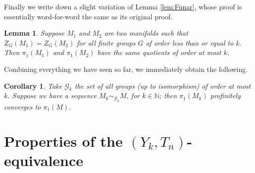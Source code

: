 \documentclass[12pt]{amsart}
\newtheorem{lem}[thm]{Lemma}
\newtheorem{cor}[thm]{Corollary}
\theoremstyle{definition}
\newcommand{\N}{\mathbb{N}}
\begin{document}
Finally we write down a slight variation of Lemma \ref{lem:Funar}, whose proof is essentially word-for-word the same as its original proof.

\begin{lem}
	Suppose $M_1$ and $M_2$ are two manifolds such that $Z_G(M_1)=Z_G(M_2)$ for all finite groups $G$ of order less than or equal to $k$. Then $\pi_1(M_1)$ and $\pi_1(M_2)$ have the same quotients of order at most $k$.
\end{lem}

Combining everything we have seen so far, we immediately obtain the following.

\begin{cor}\label{cor:convergence}
	Take $\mathcal{G}_k$ the set of all groups (up to isomorphism) of order at most $k$. Suppose  we have a sequence $M_k\sim_{\mathcal{G}_k} M$, for $k\in \N$; then $\pi_1(M_k)$ profinitely converges to $\pi_1(M)$.
\end{cor}

\section{Properties of the $(Y_k,T_n)$-equivalence}
\label{sec:equivRelProp}
\end{document}
